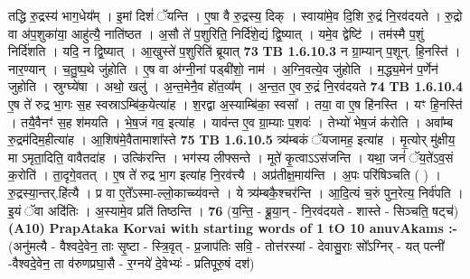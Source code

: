 \documentclass[17pt]{extarticle}
\begin{document}
                  तद्धि रु॒द्रस्य॑ भाग॒धेय᳚म् । इ॒मां दिशं॑ ॅयन्ति । ए॒षा वै रु॒द्रस्य॒ दिक् । स्वाया॑मे॒व दि॒शि रु॒द्रं नि॒रव॑दयते । रु॒द्रो वा अ॑प॒शुका॑या॒ आहु॑त्यै॒ नाति॑ष्ठत । अ॒सौ ते॑ प॒शुरिति॒ निर्दि॑शे॒द्यं द्वि॒ष्यात् । यमे॒व द्वेष्टि॑ । तम॑स्मै प॒शुं निर्दि॑शति । यदि॒ न द्वि॒ष्यात् । आ॒खुस्ते॑ प॒शुरिति॑ ब्रूयात् \textbf{ 73} \newline
                  \newline
                                \textbf{ TB 1.6.10.3} \newline
                  न ग्रा॒म्यान् प॒शून्. हि॒नस्ति॑ । नार॒ण्यान् । च॒तु॒ष्प॒थे जु॑होति । ए॒ष वा अ॑ग्नी॒नां पड्बी॑शो॒ नाम॑ । अ॒ग्नि॒वत्ये॒व जु॑होति । म॒द्ध्य॒मेन॑ प॒र्णेन॑ जुहोति । स्रुग्घ्ये॑षा । अथो॒ खलु॑ । अ॒न्त॒मेनै॒व हो॑त॒व्य᳚म् । अ॒न्त॒त ए॒व रु॒द्रं नि॒रव॑दयते \textbf{ 74} \newline
                  \newline
                                \textbf{ TB 1.6.10.4} \newline
                  ए॒ष ते॑ रुद्र भा॒गः स॒ह स्वस्राऽम्बि॑क॒येत्या॑ह । श॒रद्वा अ॒स्याम्बि॑का॒ स्वसा᳚ । तया॒ वा ए॒ष हि॑नस्ति । यꣳ हि॒नस्ति॑ । तयै॒वैनꣳ॑ स॒ह श॑मयति । भे॒ष॒जं गव॒ इत्या॑ह । याव॑न्त ए॒व ग्रा॒म्याः प॒शवः॑ । तेभ्यो॑ भेष॒जं क॑रोति । अवा᳚म्ब रु॒द्रम॑दिम॒हीत्या॑ह । आ॒शिष॑मे॒वैतामाशा᳚स्ते \textbf{ 75} \newline
                  \newline
                                \textbf{ TB 1.6.10.5} \newline
                  त्र्य॑म्बकं ॅयजामह॒ इत्या॑ह । मृ॒त्योर् मु॑क्षीय॒ मा ऽमृता॒दिति॒ वावैतदा॑ह । उत्कि॑रन्ति । भग॑स्य लीफ्सन्ते । मूते॑ कृ॒त्वाऽऽस॑जन्ति । यथा॒ जनं॑ ॅय॒ते॑ऽव॒सं क॒रोति॑ । ता॒दृगे॒वतत् । ए॒ष ते॑ रुद्र भा॒ग इत्या॑ह नि॒रव॑त्त्यै । अप्र॑तीक्ष॒माय॑न्ति । अ॒पः परि॑षिञ्चति ( ) । रु॒द्रस्या॒न्तर्.हि॑त्यै । प्र वा ए॒ते᳚ऽस्मा-ल्लो॒काच्च्य॑वन्ते । ये त्र्य॑म्बकै॒श्चर॑न्ति । आ॒दि॒त्यं च॒रुं पुन॒रेत्य॒ निर्व॑पति । इ॒यं ॅवा अदि॑तिः । अ॒स्यामे॒व प्रति॑ तिष्ठन्ति । \textbf{ 76} \newline
                  \newline
                                    (य॒न्ति॒ - ब्रू॒या॒न् - नि॒रव॑दयते - शास्ते - सिञ्चति॒ षट्च॑) \textbf{(A10)} \newline \newline
                \textbf{PrapAtaka Korvai with starting  words of 1 tO 10 anuvAkams :-} \newline
        (अनु॑मत्यै - वैश्वदे॒वेन॒ ताः सृ॒ष्टा - स्त्रि॒वृत् - प्र॒जाप॑तिः सवि॒ - तोत्त॑रस्यां - देवासु॒राः सो᳚ऽग्निर् - यत् पत्नी॑ -वैश्वदे॒वेन॒ ता व॑रुणप्रघा॒सै - र॒ग्नये॑ दे॒वेभ्यः॑ - प्रतिपूरु॒षं दश॑) \newline
\end{document}
